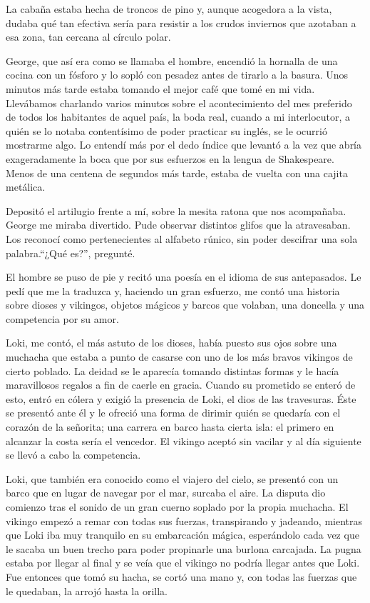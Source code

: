 \documentclass[11pt,twoside,openright,a6paper]{book}
\begin{document}
La cabaña estaba hecha de troncos de pino y, aunque acogedora a la vista, dudaba qué tan efectiva sería para resistir a los crudos inviernos que azotaban a esa zona, tan cercana al círculo polar.

George, que así era como se llamaba el hombre, encendió la hornalla de una cocina con un fósforo y lo sopló con pesadez antes de tirarlo a la basura. Unos minutos más tarde estaba tomando el mejor café que tomé en mi vida. Llevábamos charlando varios minutos sobre el acontecimiento del mes preferido de todos los habitantes de aquel país, la boda real, cuando a mi interlocutor, a quién se lo notaba contentísimo de poder practicar su inglés, se le ocurrió mostrarme algo. Lo entendí más por el dedo índice que levantó a la vez que abría exageradamente la boca que por sus esfuerzos en la lengua de Shakespeare. Menos de una centena de segundos más tarde, estaba de vuelta con una cajita metálica.

Depositó el artilugio frente a mí, sobre la mesita ratona que nos acompañaba. George me miraba divertido. Pude observar distintos glifos que la atravesaban. Los reconocí como pertenecientes al alfabeto rúnico, sin poder descifrar una sola palabra.“¿Qué es?”, pregunté.

El hombre se puso de pie y recitó una poesía en el idioma de sus antepasados. Le pedí que me la traduzca y, haciendo un gran esfuerzo, me contó una historia sobre dioses y vikingos, objetos mágicos y barcos que volaban, una doncella y una competencia por su amor.

Loki, me contó, el más astuto de los dioses, había puesto sus ojos sobre una muchacha que estaba a punto de casarse con uno de los más bravos vikingos de cierto poblado. La deidad se le aparecía tomando distintas formas y le hacía maravillosos regalos a fin de caerle en gracia. Cuando su prometido se enteró de esto, entró en cólera y exigió la presencia de Loki, el dios de las travesuras. Éste se presentó ante él y le ofreció una forma de dirimir quién se quedaría con el corazón de la señorita; una carrera en barco hasta cierta isla: el primero en alcanzar la costa sería el vencedor. El vikingo aceptó sin vacilar y al día siguiente se llevó a cabo la competencia.

Loki, que también era conocido como el viajero del cielo, se presentó con un barco que en lugar de navegar por el mar, surcaba el aire. La disputa dio comienzo tras el sonido de un gran cuerno soplado por la propia muchacha. El vikingo empezó a remar con todas sus fuerzas, transpirando y jadeando, mientras que Loki iba muy tranquilo en su embarcación mágica, esperándolo cada vez que le sacaba un buen trecho para poder propinarle una burlona carcajada. La pugna estaba por llegar al final y se veía que el vikingo no podría llegar antes que Loki. Fue entonces que tomó su hacha, se cortó una mano y, con todas las fuerzas que le quedaban, la arrojó hasta la orilla.
\end{document}
